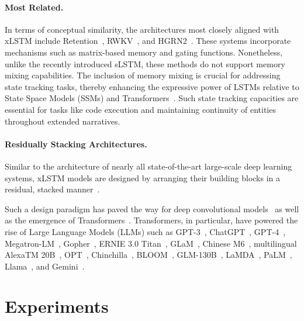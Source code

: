 \paragraph{Most Related.} In terms of conceptual similarity, the architectures most closely aligned with xLSTM include Retention~\citep{Sun:23arxiv}, RWKV~\citep{Peng:23arxivshort,Peng:24arxivshort}, and HGRN2~\citep{Qin:24arxiv}. These systems incorporate mechanisms such as matrix-based memory and gating functions. Nonetheless, unlike the recently introduced sLSTM, these methods do not support memory mixing capabilities. The inclusion of memory mixing is crucial for addressing state tracking tasks, thereby enhancing the expressive power of LSTMs relative to State Space Models (SSMs) and Transformers~\citep{Merrill:24,Deletang:23}. Such state tracking capacities are essential for tasks like code execution and maintaining continuity of entities throughout extended narratives.

\paragraph{Residually Stacking Architectures.} Similar to the architecture of nearly all state-of-the-art large-scale deep learning systems, xLSTM models are designed by arranging their building blocks in a residual, stacked manner~\citep{Srivastava:15,He:16}.

Such a design paradigm has paved the way for deep convolutional models~\citep{He:16} as well as the emergence of Transformers~\citep{Vaswani:17}. Transformers, in particular, have powered the rise of Large Language Models (LLMs) such as GPT-3~\citep{Brown:20short}, ChatGPT~\citep{Schulman:22short}, GPT-4~\citep{Achiam:23gpt4short}, Megatron-LM~\citep{Shoeybi:19}, Gopher~\citep{Rae:21short}, ERNIE 3.0 Titan~\citep{Wang:21arxivshort}, GLaM~\citep{Du:21glamshort}, Chinese M6~\citep{Lin:21}, multilingual AlexaTM 20B~\citep{Soltan:22}, OPT~\citep{Zhang:22opt}, Chinchilla~\citep{Hoffmann:22short}, BLOOM~\citep{Scao:22arxivshort}, GLM-130B~\citep{Zeng:22arxivshort}, LaMDA~\citep{Thoppilan:22short}, PaLM~\citep{Chowdhery:22short}, Llama~\citep{Touvron:23arxiv}, and Gemini~\citep{GeminiTeam:23arxiv,Reid:24arxiv}.

\section{Experiments}
\label{sec:Exp}

